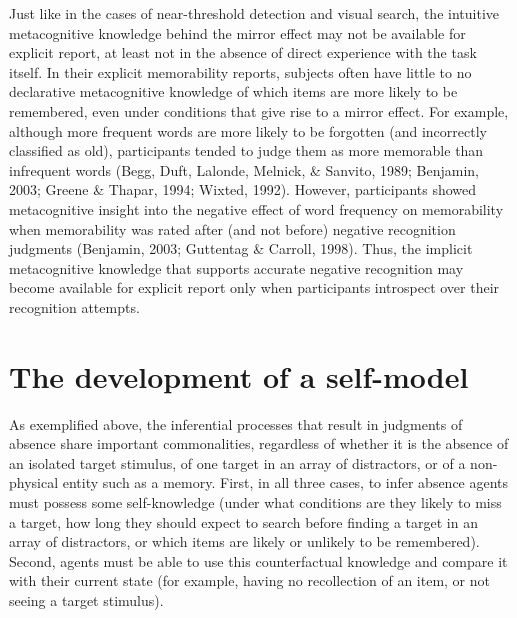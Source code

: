 \documentclass[12pt,twoside]{reedthesis}
\begin{document}
Just like in the cases of near-threshold detection and visual search, the intuitive metacognitive knowledge behind the mirror effect may not be available for explicit report, at least not in the absence of direct experience with the task itself. In their explicit memorability reports, subjects often have little to no declarative metacognitive knowledge of which items are more likely to be remembered, even under conditions that give rise to a mirror effect. For example, although more frequent words are more likely to be forgotten (and incorrectly classified as old), participants tended to judge them as more memorable than infrequent words (Begg, Duft, Lalonde, Melnick, \& Sanvito, 1989; Benjamin, 2003; Greene \& Thapar, 1994; Wixted, 1992). However, participants showed metacognitive insight into the negative effect of word frequency on memorability when memorability was rated after (and not before) negative recognition judgments (Benjamin, 2003; Guttentag \& Carroll, 1998). Thus, the implicit metacognitive knowledge that supports accurate negative recognition may become available for explicit report only when participants introspect over their recognition attempts.

\hypertarget{the-development-of-a-self-model}{%
\section{The development of a self-model}\label{the-development-of-a-self-model}}

As exemplified above, the inferential processes that result in judgments of absence share important commonalities, regardless of whether it is the absence of an isolated target stimulus, of one target in an array of distractors, or of a non-physical entity such as a memory. First, in all three cases, to infer absence agents must possess some self-knowledge (under what conditions are they likely to miss a target, how long they should expect to search before finding a target in an array of distractors, or which items are likely or unlikely to be remembered). Second, agents must be able to use this counterfactual knowledge and compare it with their current state (for example, having no recollection of an item, or not seeing a target stimulus).
\end{document}
